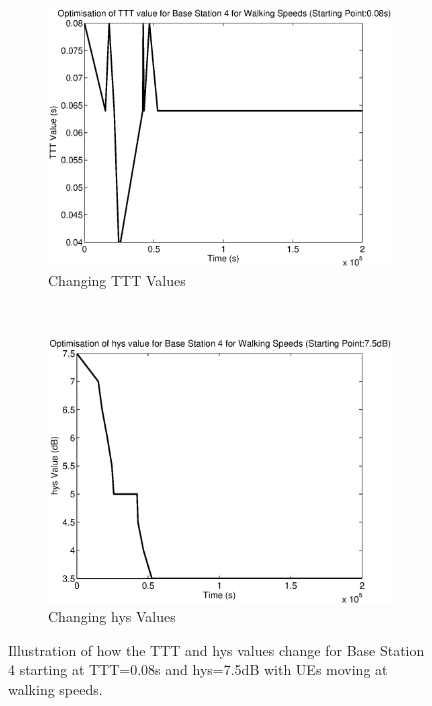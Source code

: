 \begin{figure}[H]
        \centering
        \begin{subfigure}[b]{0.49\textwidth}
                \includegraphics[width=\textwidth]{figures/graphs/walkhighhys/TTT4.eps}
                \caption{Changing TTT Values}
        \end{subfigure}%
        ~ %
        \begin{subfigure}[b]{0.49\textwidth}
                \includegraphics[width=\textwidth]{figures/graphs/walkhighhys/hys4.eps}
                \caption{Changing hys Values}
        \end{subfigure}
        \caption{Illustration of how the TTT and hys values change for Base Station 4 starting at TTT=0.08s and hys=7.5dB with UEs moving at walking speeds.}
\end{figure}
